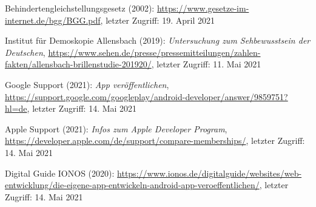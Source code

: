 \documentclass[11pt,a4paper]{article}
\begin{document}
\begin{itemize}
     Behindertengleichstellungsgesetz (2002): \url{https://www.gesetze-im-internet.de/bgg/BGG.pdf}, letzter Zugriff: 19. April 2021

     Institut für Demoskopie Allensbach (2019): \textit{Untersuchung zum Sehbewusstsein der Deutschen},  \url{https://www.sehen.de/presse/pressemitteilungen/zahlen-fakten/allensbach-brillenstudie-201920/}, letzter Zugriff: 11. Mai 2021

     Google Support (2021): \textit{App veröffentlichen}, \url{https://support.google.com/googleplay/android-developer/answer/9859751?hl=de}, letzter Zugriff: 14. Mai 2021

     Apple Support (2021): \textit{Infos zum Apple Developer Program}, \url{https://developer.apple.com/de/support/compare-memberships/}, letzter Zugriff: 14. Mai 2021
    
     Digital Guide IONOS (2020): \url{https://www.ionos.de/digitalguide/websites/web-entwicklung/die-eigene-app-entwickeln-android-app-veroeffentlichen/}, letzter Zugriff: 14. Mai 2021
\end{itemize}
\end{document}
